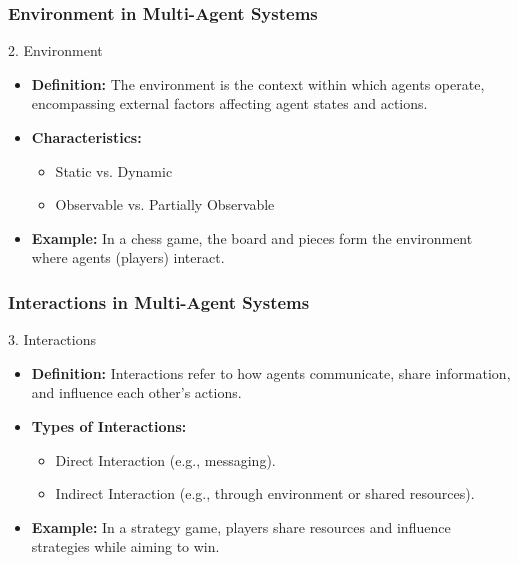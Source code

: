 \documentclass[aspectratio=169]{beamer}
\begin{document}
\begin{frame}[fragile]
    \frametitle{Environment in Multi-Agent Systems}
    \begin{block}{2. Environment}
        \begin{itemize}
            \item \textbf{Definition:} The environment is the context within which agents operate, encompassing external factors affecting agent states and actions.
            \item \textbf{Characteristics:}
                \begin{itemize}
                    \item Static vs. Dynamic
                    \item Observable vs. Partially Observable
                \end{itemize}
            \item \textbf{Example:} In a chess game, the board and pieces form the environment where agents (players) interact.
        \end{itemize}
    \end{block}
\end{frame}

\begin{frame}[fragile]
    \frametitle{Interactions in Multi-Agent Systems}
    \begin{block}{3. Interactions}
        \begin{itemize}
            \item \textbf{Definition:} Interactions refer to how agents communicate, share information, and influence each other's actions.
            \item \textbf{Types of Interactions:}
                \begin{itemize}
                    \item Direct Interaction (e.g., messaging).
                    \item Indirect Interaction (e.g., through environment or shared resources).
                \end{itemize}
            \item \textbf{Example:} In a strategy game, players share resources and influence strategies while aiming to win.
        \end{itemize}
    \end{block}
\end{frame}
\end{document}
